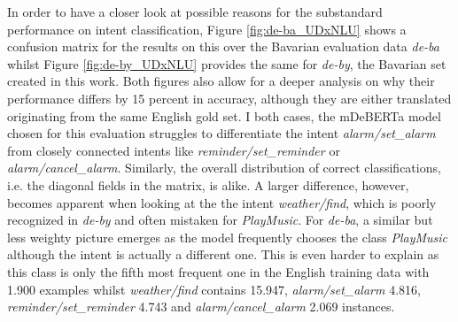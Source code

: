 \documentclass[11pt,a4paper,twoside,openright]{scrbook}
\begin{document}
In order to have a closer look at possible reasons for the substandard performance on intent classification, Figure \ref{fig:de-ba_UDxNLU} shows a confusion matrix for the results on this over the Bavarian evaluation data \textit{de-ba} whilst Figure \ref{fig:de-by_UDxNLU} provides the same for \textit{de-by}, the Bavarian set created in this work. Both figures also allow for a deeper analysis on why their performance differs by 15 percent in accuracy, although they are either translated originating from the same English gold set. I both cases, the mDeBERTa model chosen for this evaluation struggles to differentiate the intent \textit{alarm/set\_alarm} from closely connected intents like \textit{reminder/set\_reminder} or \textit{alarm/cancel\_alarm}. Similarly, the overall distribution of correct classifications, i.e. the diagonal fields in the matrix, is alike. A larger difference, however, becomes apparent when looking at the the intent \textit{weather/find}, which is poorly recognized in \textit{de-by} and often mistaken for \textit{PlayMusic}. For \textit{de-ba}, a similar but less weighty picture emerges as the model frequently chooses the class \textit{PlayMusic} although the intent is actually a different one. This is even harder to explain as this class is only the fifth most frequent one in the English training data with 1.900 examples whilst \textit{weather/find} contains 15.947, \textit{alarm/set\_alarm} 4.816, \textit{reminder/set\_reminder} 4.743 and \textit{alarm/cancel\_alarm} 2.069 instances.

\begin{table}[!ht]
\caption{Results for the basic multi-task UDxNLU experiment with mDeBERTa according to Upper German dialects over three random seeds, Avg. = average on languages without English, German and Swiss German, Diff. = average performance difference to mDeBERTa baseline, sd = standard deviation}
\label{tab:mDeBERTa_exp1_udnlu_dialects}
\end{table}
\end{document}
